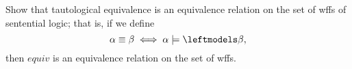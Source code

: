 \begin{problem}
  Show that tautological equivalence is an equivalence relation
  on the set of wffs of sentential logic;
  that is, if we define
  \[ \alpha \equiv \beta \iff \alpha \models \backmodels \beta, \]
  then $equiv$ is an equivalence relation on the set of wffs.
\end{problem}
